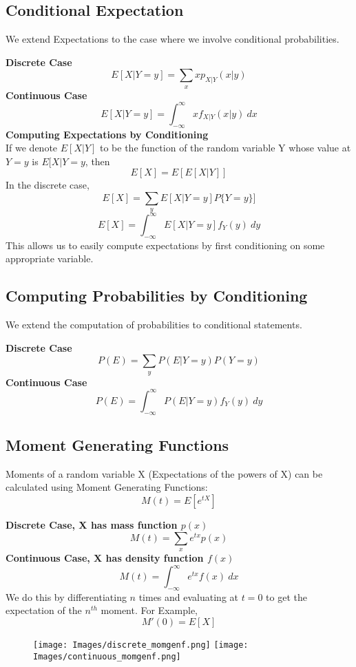 \documentclass[10pt,a4paper]{article}
\begin{document}
    \subsection{Conditional Expectation}
    We extend Expectations to the case where we involve conditional probabilities.
    \begin{framed}
    	\centering\textbf{Discrete Case}
    	$$E[X|Y=y] = \sum_{x}xp_{X|Y}(x|y)$$ 
    	\centering\textbf{Continuous Case}
    	$$E[X|Y=y] = \int_{-\infty}^{\infty}xf_{X|Y}(x|y)\ dx$$
    	\centering\textbf{Computing Expectations by Conditioning} \\
    	If we denote $E[X|Y]$ to be the function of the random variable Y whose value at $Y=y$ is $E[X|Y=y$, then $$E[X] = E[E[X|Y]]$$
    	In the discrete case, $$E[X] = \sum_{y}E[X|Y=y]P\{Y=y\}]$$
    	$$E[X] = \int_{-\infty}^{\infty}E[X|Y=y]f_{Y}(y)\ dy$$
    	This allows us to easily compute expectations by first conditioning on some appropriate variable.
    \end{framed}  	 	   
    \newpage 
    \subsection{Computing Probabilities by Conditioning}
    We extend the computation of probabilities to conditional statements.
    \begin{framed}
    \centering\textbf{Discrete Case}
    $$P(E) = \sum_{y}P(E|Y=y)P(Y=y)$$ 
    \centering\textbf{Continuous Case}
    $$P(E) = \int_{-\infty}^{\infty}P(E|Y=y)f_{Y}(y)\ dy$$
\end{framed}
\subsection{Moment Generating Functions}
Moments of a random variable X (Expectations of the powers of X) can be calculated using Moment Generating Functions:
$$M(t) = E[e^{tX}]$$
\begin{framed}
	\centering\textbf{Discrete Case, X has mass function $p(x)$}
	$$M(t) = \sum_{x}e^{tx}p(x)$$
	\centering\textbf{Continuous Case, X has density function $f(x)$}
	$$M(t) = \int_{-\infty}^{\infty}e^{tx}f(x)\ dx$$
	We do this by differentiating $n$ times and evaluating at $t=0$ to get the expectation of the $n^{th}$ moment. For Example, $$M'(0) = E[X]$$
\end{framed}
\newpage 
\begin{figure}[h]
\texttt{[image: Images/discrete\_momgenf.png]}   
\texttt{[image: Images/continuous\_momgenf.png]}      	
\end{figure}   	
\newpage    	 	      	    
\end{document}
